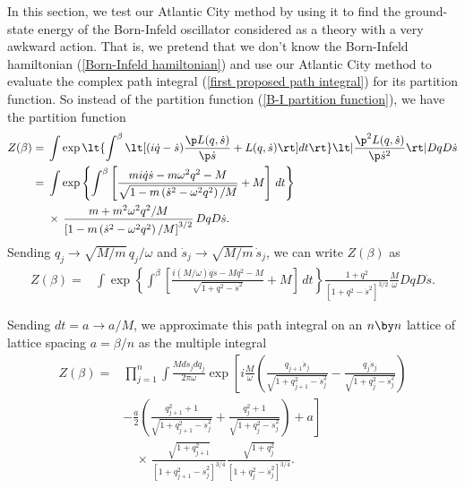 \documentclass[prd,preprint,floatfix,showpacs]{revtex4-1}
\begin{document}
In this section,
we test our Atlantic City method
by using it to find the 
ground-state energy 
of the Born-Infeld oscillator
considered 
as a theory with a very awkward action.
That is, we pretend that
we don't know the Born-Infeld hamiltonian 
(\ref {Born-Infeld hamiltonian})
and use our Atlantic City method to
evaluate the complex path integral
(\ref {first proposed path integral})
for its partition function.
So instead of the partition function
(\ref {B-I partition function}),
we have the partition function 
\begin{equation}
   \begin{split}
Z(\beta) ={}& \int \exp \lt\{ \int^\beta \lt[  ( i \dot q
- \dot s ) \frac{ \p  L(q, \dot s)  }{ \p \dot s }
+ L(q, \dot s) 
\rt] dt \rt\}  
\lt| \frac{ \p^2  L(q, \dot s) }
{ \p \dot s^2  }  \rt|
 Dq D\dot s
\\
={}& \int \exp\left\{
\int^\beta \left[
\frac{m i\dot q \dot s - m\omega^2 q^2 -M}
{\sqrt{1 - m \left( \dot s^2 - \omega^2 q^2 \right)/M}}
+ M \right] \, dt \right\}
\\
{}& \times \, \frac{m + m^2 \omega^2 q^2/M}
{\left[ 1 - 
m \left( \dot s ^2 - \omega^2 q^2 \right)/M\right]^{3/2}}
\, Dq D\dot s .
\label {instead of the partition function}
   \end{split}
\end{equation}
Sending \( q_j \to \sqrt{M/m} \, q_j/\omega \) and
\( \dot s_j \to \sqrt{M/m} \, \dot s_j \), 
we can write \( Z(\beta)  \) as
\begin{equation}
   \begin{split}
Z(\beta) ={}& \int \exp\left\{
\int^\beta \left[ 
\frac{i (M/\omega) \dot q \dot s - M q^2 - M}
{\sqrt{1 + q^2 - \dot s^2}}
+ M \right] \, dt \right\}
\frac{1 + q^2}
{\left[ 1 + q^2 - \dot s ^2 \right]^{3/2}}
\frac{M}{\omega} Dq D\dot s .
\label {we can write Z(beta) as}
   \end{split}
\end{equation}
\par
Sending \( dt = a \to a/M \),
we approximate this path integral 
on an \( n \by n \) lattice
of lattice spacing \( a = \beta/n \)
as the multiple integral
\begin{equation}
   \begin{split}
Z(\beta) ={}& \prod_{j=1}^n \int 
\frac{M d\dot s_j dq_j}{2\pi \omega} 
\exp  \left[ 
i \frac{M}{\omega} \left(
\frac{q_{j + 1} \dot s_j}
{\sqrt{1 + q^2_{j+1} - \dot s^2_j }}
- \frac{q_j  \dot s_j }
{\sqrt{1 + q^2_j - \dot s^2_j }} \right) \right.
\\
{}& \left.
- \frac{a}{2}\left(
\frac{q^2_{j+1} + 1}{\sqrt{1 + q^2_{j+1} - \dot s^2_j }}
+
\frac{q^2_j + 1}{\sqrt{1 + q^2_j - \dot s^2_j }} \right) 
+ a \right] 
\\
{}&\quad \times \, \frac{\sqrt{1 +  q^2_{j+1}}}
{\left[ 1 + q^2_{j+1} - \dot s ^2_j \right]^{3/4}}
\frac{\sqrt{1 +  q^2_j}}
{\left[ 1 + q^2_j - \dot s ^2_j \right]^{3/4}} .
\label {We approximate this path integral}
   \end{split}
\end{equation}
\end{document}
